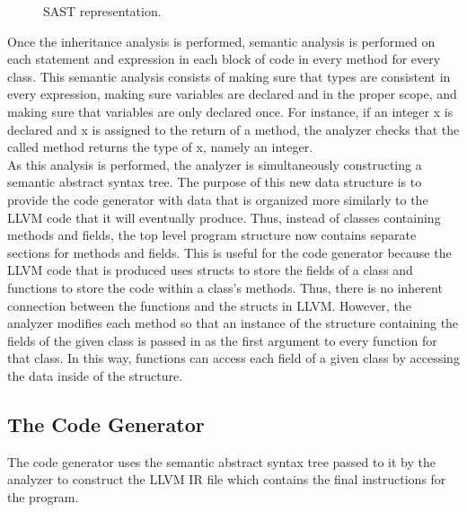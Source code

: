 \begin{homeworkProblem}
\begin{figure}[!ht]
		\caption{SAST representation.}
	\end{figure}
	Once the inheritance analysis is performed, semantic analysis is performed on each statement and expression in each block of code in every method for every class. This semantic analysis consists of making sure that types are consistent in every expression, making sure variables are declared and in the proper scope, and making sure that variables are only declared once. For instance, if an integer x is declared and x is assigned to the return of a method, the analyzer checks that the called method returns the type of x, namely an integer.\\
	As this analysis is performed, the analyzer is simultaneously constructing a semantic abstract syntax tree. The purpose of this new data structure is to provide the code generator with data that is organized more similarly to the LLVM code that it will eventually produce. Thus, instead of classes containing methods and fields, the top level program structure now contains separate sections for methods and fields. This is useful for the code generator because the LLVM code that is produced uses structs to store the fields of a class and functions to store the code within a class's methods. Thus, there is no inherent connection between the functions and the structs in LLVM. However, the analyzer modifies each method so that an instance of the structure containing the fields of the given class is passed in as the first argument to every function for that class. In this way, functions can access each field of a given class by accessing the data inside of the structure. 
	
	\subsection{The Code Generator}
    
    The code generator uses the semantic abstract syntax tree passed to it by the analyzer to construct the LLVM IR file which contains the final instructions for the program. \\
    

\end{homeworkProblem}
